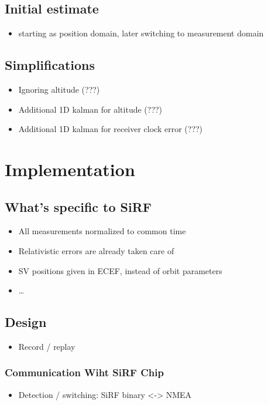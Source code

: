 \subsection{Initial estimate}
\begin{itemize}
\item starting as position domain, later switching to measurement domain
\end{itemize}

\subsection{Simplifications}
\begin{itemize}
\item Ignoring altitude (???)
\item Additional 1D kalman for altitude (???)
\item Additional 1D kalman for receiver clock error (???)
\end{itemize}

\section{Implementation}

\subsection{What's specific to SiRF}
\begin{itemize}
\item All measurements normalized to common time
\item Relativistic errors are already taken care of
\item SV positions given in ECEF, instead of orbit parameters
\item \ldots
\end{itemize}

\subsection{Design}
\begin{itemize}
\item Record / replay
\end{itemize}

\subsubsection{Communication Wiht SiRF Chip}
\begin{itemize}
\item Detection / switching: SiRF binary <-> NMEA
\end{itemize}

